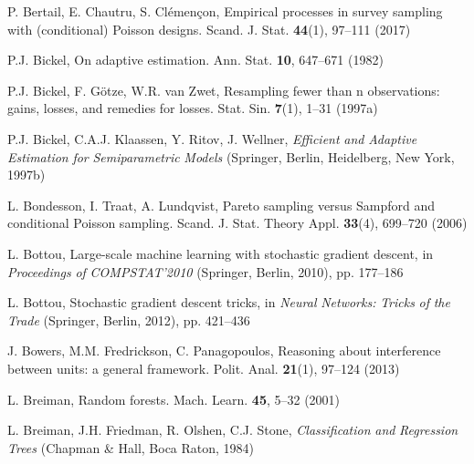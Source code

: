 \begin{list}{}{\setlength{\leftmargin}{2.1em}\setlength{\labelwidth}{0pt}
  \setlength{\labelsep}{0pt}\setlength{\itemindent}{-2.1em}
  \setlength{\parsep}{0pt}\setlength{\itemsep}{2pt}\setlength{\topsep}{0pt}}
\item\label{refentry:REF034}P. Bertail, E. Chautru, S. Clémençon, Empirical processes in survey sampling with (conditional) Poisson designs. Scand. J. Stat. \textbf{44}(1), 97--111 (2017)\label{refend:REF034}
\item\label{refentry:REF035}P.J. Bickel, On adaptive estimation. Ann. Stat. \textbf{10}, 647--671 (1982)\label{refend:REF035}
\item\label{refentry:REF036}P.J. Bickel, F. Götze, W.R. van Zwet, Resampling fewer than n observations: gains, losses, and remedies for losses. Stat. Sin. \textbf{7}(1), 1--31 (1997a)\label{refend:REF036}
\item\label{refentry:REF037}P.J. Bickel, C.A.J. Klaassen, Y. Ritov, J. Wellner, \textit{Efficient} \textit{and} \textit{Adaptive} \textit{Estimation} \textit{for} \textit{Semiparametric} \textit{Models} (Springer, Berlin, Heidelberg, New York, 1997b)\label{refend:REF037}
\item\label{refentry:REF038}L. Bondesson, I. Traat, A. Lundqvist, Pareto sampling versus Sampford and conditional Poisson sampling. Scand. J. Stat. Theory Appl. \textbf{33}(4), 699--720 (2006)\label{refend:REF038}
\item\label{refentry:REF039}L. Bottou, Large-scale machine learning with stochastic gradient descent, in \textit{Proceedings} \textit{of} \textit{COMPSTAT'2010} (Springer, Berlin, 2010), pp. 177--186\label{refend:REF039}
\item\label{refentry:REF040}L. Bottou, Stochastic gradient descent tricks, in \textit{Neural} \textit{Networks:} \textit{Tricks} \textit{of} \textit{the} \textit{Trade} (Springer, Berlin, 2012), pp. 421--436\label{refend:REF040}
\item\label{refentry:REF041}J. Bowers, M.M. Fredrickson, C. Panagopoulos, Reasoning about interference between units: a general framework. Polit. Anal. \textbf{21}(1), 97--124 (2013)\label{refend:REF041}
\item\label{refentry:REF042}L. Breiman, Random forests. Mach. Learn. \textbf{45}, 5--32 (2001)\label{refend:REF042}
\item\label{refentry:REF043}L. Breiman, J.H. Friedman, R. Olshen, C.J. Stone, \textit{Classification} \textit{and} \textit{Regression} \textit{Trees} (Chapman \& Hall, Boca Raton, 1984)\label{refend:REF043}

\end{list}
